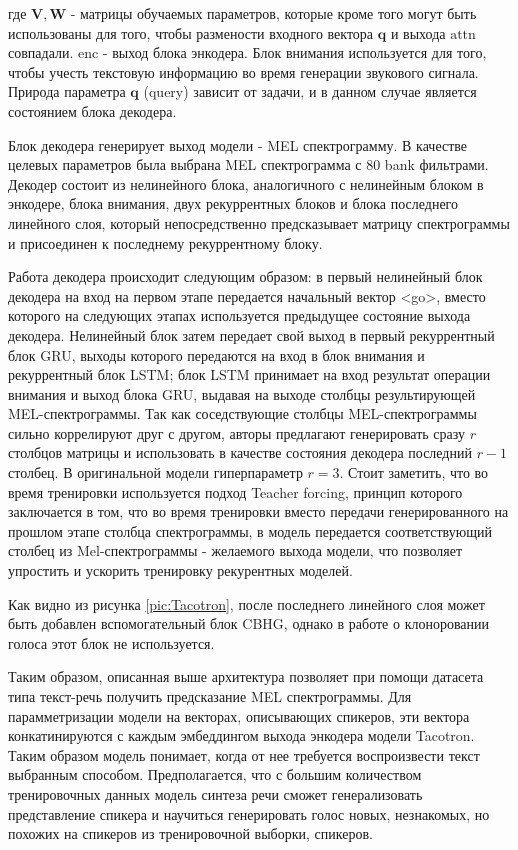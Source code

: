 \documentclass[oneside,final,14pt]{extreport}
\begin{document}
  где $\mathbf{V}, \mathbf{W}$ - матрицы обучаемых параметров, которые кроме того могут быть использованы для того, чтобы размености входного вектора  $\mathbf{q}$  и выхода $\text{attn}$ совпадали.  $\text{enc}$ - выход блока энкодера. Блок внимания используется для того, чтобы учесть текстовую информацию во время генерации звукового сигнала. Природа параметра $\mathbf{q}$ (query) зависит от задачи, и в данном случае является состоянием блока декодера.
  
  Блок декодера генерирует выход модели - MEL спектрограмму. В качестве целевых параметров была выбрана MEL спектрограмма с 80 bank фильтрами.  Декодер состоит из нелинейного блока, аналогичного с нелинейным блоком в энкодере, блока внимания, двух рекуррентных блоков и блока последнего линейного слоя, который непосредственно предсказывает матрицу спектрограммы и присоединен к последнему рекуррентному блоку. 
  
  Работа декодера происходит следующим образом: в первый нелинейный блок декодера на вход на первом этапе передается начальный вектор <go>, вместо которого на следующих этапах используется предыдущее состояние выхода декодера.  Нелинейный блок затем передает свой выход в первый рекуррентный блок GRU, выходы которого передаются на вход в блок внимания и рекуррентный блок LSTM\cite{bib:LSTM}; блок LSTM принимает на вход результат операции внимания и выход блока GRU, выдавая на выходе столбцы результирующей MEL-спектрограммы. Так как соседствующие столбцы MEL-спектрограммы сильно коррелируют друг с другом, авторы предлагают генерировать сразу $r$ столбцов матрицы и использовать в качестве состояния декодера последний $r-1$ столбец. В оригинальной модели гиперпараметр $r = 3$. Стоит заметить, что во время тренировки используется подход Teacher forcing\cite{bib:teacher_forcing}, принцип которого заключается в том, что во время тренировки вместо передачи генерированного на прошлом этапе столбца спектрограммы, в модель передается соответствующий столбец из Mel-спектрограммы - желаемого выхода модели, что позволяет упростить и ускорить тренировку рекурентных моделей.  
  
  Как видно из рисунка \ref{pic:Tacotron}, после последнего линейного слоя может быть добавлен вспомогательный блок CBHG, однако в работе о клоноровании голоса\cite{bib:voice_cloning} этот блок не используется.
  
  Таким образом, описанная выше архитектура позволяет при помощи датасета типа текст-речь получить предсказание MEL спектрограммы. Для парамметризации модели на векторах, описывающих спикеров, эти вектора конкатинируются с каждым эмбеддингом выхода энкодера модели Tacotron. Таким образом модель понимает, когда от нее требуется воспроизвести текст выбранным способом. Предполагается, что с большим количеством тренировочных данных модель синтеза речи сможет генерализовать представление спикера и научиться генерировать голос новых, незнакомых, но похожих на спикеров из тренировочной выборки, спикеров.
  
\end{document}
